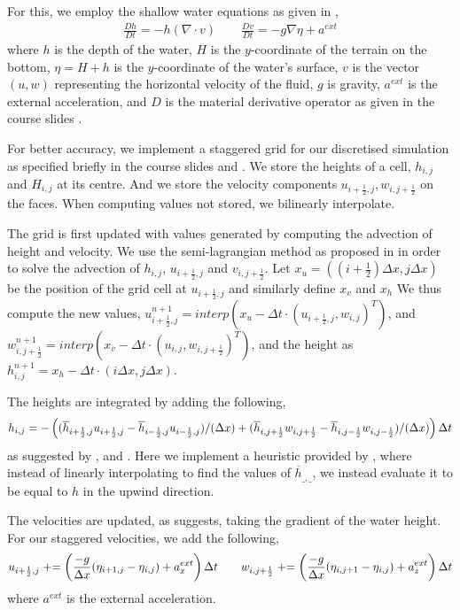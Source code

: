 For this, we employ the shallow water equations as given in \cite{hfluid},
\begin{align*}
    \frac{Dh}{Dt} = -h (\nabla \cdot v) \hspace{2em} \frac{Dv}{Dt} = -g\nabla \eta + a^{ext}
\end{align*}
where $h$ is the depth of the water, $H$ is the $y$-coordinate of the terrain on the bottom, $\eta = H+h$ is the $y$-coordinate of the water's surface, $v$ is the vector $(u,w)$ representing the horizontal velocity of the fluid, $g$ is gravity, $a^{ext}$ is the external acceleration, and $D$ is the material derivative operator as given in the course slides \cite{lec:waves}.

For better accuracy, we implement a staggered grid for our discretised simulation as specified briefly in the course slides \cite{lec:waves} and \cite{hfluid}.
We store the heights of a cell, $h_{i,j}$ and $H_{i,j}$ at its centre.
And we store the velocity components $u_{i+\frac12, j}, w_{i, j+\frac12}$ on the faces.
When computing values not stored, we bilinearly interpolate.

The grid is first updated with values generated by computing the advection of height and velocity.
We use the semi-lagrangian method as proposed in \cite{lec:waves} in order to solve the advection of $h_{i,j}$, $u_{i+\frac12, j}$ and $v_{i, j+\frac12}$.
Let $x_u = ((i+\frac12) \Delta x, j \Delta x)$ be the position of the grid cell at $u_{i+\frac12, j}$ and similarly define $x_v$ and $x_h$
We thus compute the new values,
    $u^{n+1}_{i+\frac12, j} = interp(x_u - \Delta t \cdot (u_{i+\frac12,j}, w_{i,j})^T)$,
    and $w^{n+1}_{i, j+\frac12} = interp(x_v - \Delta t \cdot (u_{i,j}, w_{i,j+\frac12})^T)$,
    and the height as $h^{n+1}_{i,j} = x_h - \Delta t \cdot (i \Delta x, j \Delta x)$.

The heights are integrated by adding the following,
$$h_{i,j} = - \left( (\overline{h}_{i+\frac12, j} u_{i+\frac12, j} - \overline{h}_{i-\frac12, j} u_{i-\frac12, j})/{(\Delta x)} +  (\overline{h}_{i, j+\frac12} w_{i, j+\frac12} - \overline{h}_{i, j-\frac12} w_{i, j-\frac12})/({\Delta x})  \right) \Delta t$$
as suggested by \cite{hfluid}, and \cite{lec:waves}.
Here we implement a heuristic provided by \cite{hfluid}, where instead of linearly interpolating to find the values of $\overline h_{\_, \_}$, we instead evaluate it to be equal to $h$ in the upwind direction.

The velocities are updated, as \cite{hfluid} suggests, taking the gradient of the water height.
For our staggered velocities, we add the following,
\begin{align*}
    u_{i+\frac12, j} \mathrel{+}= \left( \frac{-g}{\Delta x} (\eta_{i+1, j} - \eta_{i,j}) + a^{ext}_x \right) \Delta t 
    \hspace{2em}
    w_{i, j+\frac12} \mathrel{+}= \left( \frac{-g}{\Delta x} (\eta_{i, j+1} - \eta_{i,j}) + a^{ext}_z \right) \Delta t 
\end{align*}
where $a^{ext}$ is the external acceleration.

